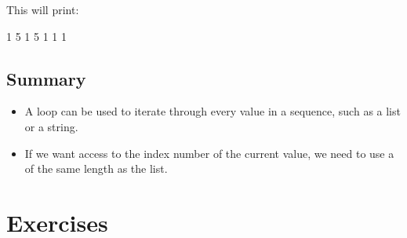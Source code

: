 \documentclass[11pt]{cselabheader}
\begin{document}
This will print:

\begin{verbatimcode}
1
5
1
5
1
1
1
\end{verbatimcode}

\subsection{\protect{}}

\subsection{Summary}
\begin{itemize}
  \item A  loop can be used to iterate through every value in a
    sequence, such as a list or a string.
  \item If we want access to the index number of the current value, we need to
    use a  of the same length as the list.
\end{itemize}

\pagebreak
\section{Exercises}
\label{sec:ex}
\end{document}

